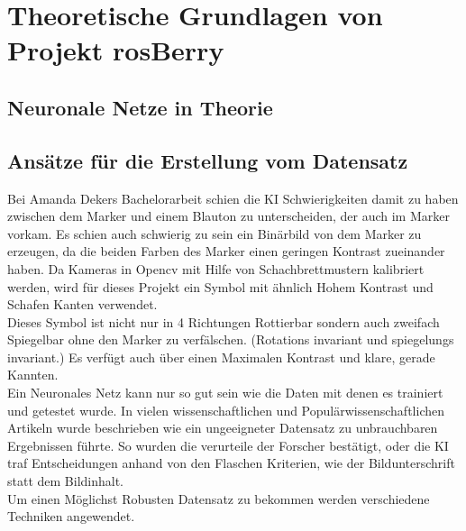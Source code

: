 \documentclass[conference]{IEEEtran}
\begin{document}
	\section{Theoretische Grundlagen von Projekt rosBerry}
	
	\subsection{Neuronale Netze in Theorie}	%
	
	\subsection{Ansätze für die Erstellung vom Datensatz}	%
	
	Bei Amanda Dekers Bachelorarbeit schien die KI Schwierigkeiten damit zu haben zwischen  dem Marker und einem Blauton zu unterscheiden, der auch im Marker vorkam. Es schien auch schwierig zu sein ein Binärbild von dem Marker zu erzeugen, da die beiden Farben des Marker einen geringen Kontrast zueinander haben. Da Kameras in Opencv mit Hilfe von Schachbrettmustern kalibriert werden, wird für dieses Projekt ein Symbol mit ähnlich Hohem Kontrast und Schafen Kanten verwendet.\\
	Dieses Symbol ist nicht nur in 4 Richtungen Rottierbar sondern auch zweifach Spiegelbar ohne den Marker zu verfälschen. (Rotations invariant und spiegelungs invariant.) Es verfügt auch über einen Maximalen Kontrast und klare, gerade Kannten. \\
	\noindent
	Ein Neuronales Netz kann nur so gut sein wie die Daten mit denen es trainiert und getestet wurde. In vielen wissenschaftlichen und Populärwissenschaftlichen Artikeln wurde beschrieben wie ein ungeeigneter Datensatz zu unbrauchbaren Ergebnissen führte. So wurden die verurteile der Forscher bestätigt, oder die KI traf Entscheidungen anhand von den Flaschen Kriterien, wie der Bildunterschrift statt dem Bildinhalt. \\
	Um einen Möglichst Robusten Datensatz zu bekommen  werden verschiedene Techniken angewendet.
\end{document}
